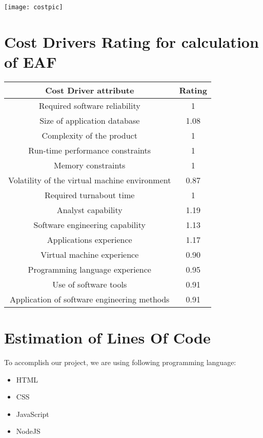 \documentclass[12pt]{article}
\begin{document}
 \texttt{[image: costpic]}
 
 \section{Cost Drivers Rating for calculation of EAF}
\begin{tabular}{|c|c|}
\hline \textbf{Cost Driver attribute} & \textbf{Rating}\\
\hline {Required software reliability} & 1\\
\hline Size of application database & 1.08\\
\hline Complexity of the product & 1\\
\hline Run-time performance constraints & 1 \\
\hline Memory constraints & 1\\
\hline Volatility of the virtual machine environment & 0.87\\
\hline Required turnabout time & 1\\
\hline Analyst capability & 1.19\\
\hline Software engineering capability & 1.13\\
\hline Applications experience & 1.17\\
\hline Virtual machine experience  & 0.90\\
\hline Programming language experience & 0.95\\
\hline Use of software tools  & 0.91\\
\hline Application of software engineering methods & 0.91\\
\hline



\end{tabular}
\newpage
\section{Estimation of Lines Of Code}

To accomplish our project, we are using following programming language:
\begin{itemize}
   
\item HTML
\item CSS

\item JavaScript
\item NodeJS

\end{itemize}
\end{document}

